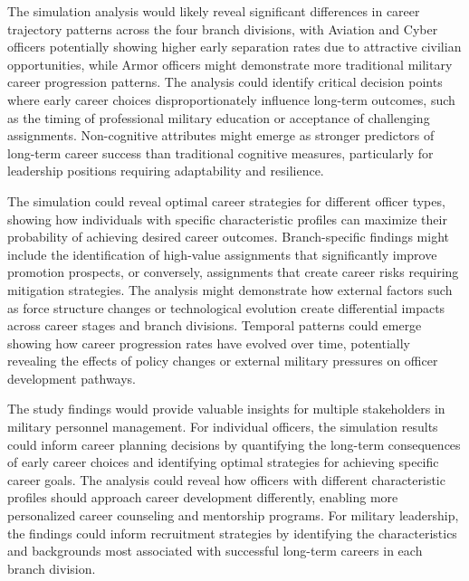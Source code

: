 \documentclass[main.tex]{subfiles}
\begin{document}

The simulation analysis would likely reveal significant differences in career trajectory patterns across the four branch divisions, with Aviation and Cyber officers potentially showing higher early separation rates due to attractive civilian opportunities, while Armor officers might demonstrate more traditional military career progression patterns. The analysis could identify critical decision points where early career choices disproportionately influence long-term outcomes, such as the timing of professional military education or acceptance of challenging assignments. Non-cognitive attributes might emerge as stronger predictors of long-term career success than traditional cognitive measures, particularly for leadership positions requiring adaptability and resilience.

The simulation could reveal optimal career strategies for different officer types, showing how individuals with specific characteristic profiles can maximize their probability of achieving desired career outcomes. Branch-specific findings might include the identification of high-value assignments that significantly improve promotion prospects, or conversely, assignments that create career risks requiring mitigation strategies. The analysis might demonstrate how external factors such as force structure changes or technological evolution create differential impacts across career stages and branch divisions. Temporal patterns could emerge showing how career progression rates have evolved over time, potentially revealing the effects of policy changes or external military pressures on officer development pathways.


The study findings would provide valuable insights for multiple stakeholders in military personnel management. For individual officers, the simulation results could inform career planning decisions by quantifying the long-term consequences of early career choices and identifying optimal strategies for achieving specific career goals. The analysis could reveal how officers with different characteristic profiles should approach career development differently, enabling more personalized career counseling and mentorship programs. For military leadership, the findings could inform recruitment strategies by identifying the characteristics and backgrounds most associated with successful long-term careers in each branch division.
\end{document}
